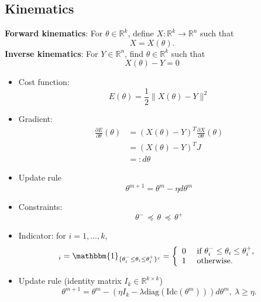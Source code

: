 \documentclass{beamer}
\begin{document}
\subsection{Kinematics}

\begin{frame}
\textbf{Forward kinematics}: \newline
For $\theta \in \mathbb{R}^{k}$, define $X: \mathbb{R}^k \rightarrow \mathbb{R}^{n}$ such that 
\begin{equation}
X = X(\theta).
\end{equation}
\textbf{Inverse kinematics}: \newline
For $Y \in \mathbb{R}^{n}$, find $\theta \in \mathbb{R}^{k}$ such that
\begin{equation}
X(\theta) - Y = 0
\end{equation}
\end{frame}

\begin{frame}
\begin{itemize}
\item Cost function:
\begin{equation}
E(\theta) = \frac{1}{2} \| X(\theta) - Y\|^2
\end{equation}
\item Gradient:
\begin{align*}
\frac{\partial E}{\partial \theta}(\theta) &= (X(\theta) - Y)^T\frac{\partial X}{\partial \theta}(\theta) \\
 & = (X(\theta) - Y)^T J \\
 & =: d\theta
\end{align*}
\item Update rule
\begin{equation}
\theta^{m+1} = \theta^m - \eta d\theta^m
\end{equation}
\end{itemize}
\end{frame}

\begin{frame}
\begin{itemize}
\item Constraints:
\begin{equation}
\theta^- \, \preceq  \, \theta  \, \preceq  \, \theta^+
\end{equation}
\item Indicator: for $i=1,...,k$,
\begin{equation}
[\text{Idc}(\theta)]_i = \mathbbm{1}_{\{ \theta^-_i \leq \theta_i \leq \theta^+_i \}^c} = \left\{
\begin{array}{ll}
0 &~\text{if}~ \theta^-_i \leq \theta_i \leq \theta^+_i, \\
1 &~\text{otherwise}.
\end{array}
\right.
\end{equation}
\item Update rule (identity matrix $I_k \in \mathbb{R}^{k \times k}$)
\begin{equation}
\theta^{m+1} = \theta^m - (\eta I_k - \lambda \text{diag}(\text{Idc}(\theta^m))) d\theta^m, ~ \lambda \geq \eta.
\end{equation}
\end{itemize}
\end{frame}
\end{document}

